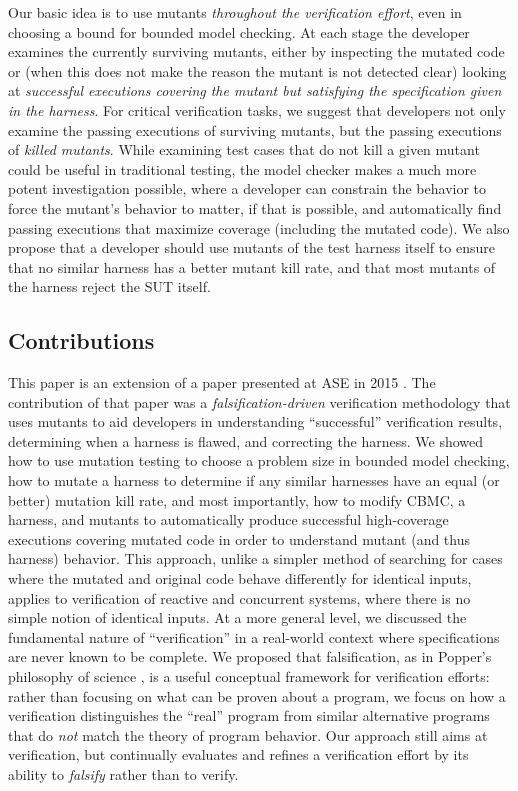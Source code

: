 \documentclass{svjour3}
\begin{document}
Our basic idea is to use mutants \emph{throughout the verification
  effort}, even in choosing a bound for bounded model checking.  At
each stage the developer examines the currently surviving mutants,
either by inspecting the mutated code or (when this does not make the
reason the mutant is not detected clear) looking at \emph{successful
  executions covering the mutant but satisfying the specification
  given in the harness}.  For critical verification tasks, we suggest
that developers not only examine the passing executions of surviving
mutants, but the passing executions of \emph{killed mutants}.  While
examining test cases that do not kill a given mutant could be useful
in traditional testing, the model checker makes a much more potent
investigation possible, where a developer can constrain the behavior
to force the mutant's behavior to matter, if that is possible, and
automatically find passing executions that maximize coverage
(including the mutated code).  We also propose that a developer should
use mutants of the test harness itself to ensure that no similar
harness has a better mutant kill rate, and that most mutants of the
harness reject the SUT itself.

\subsection{Contributions}

This paper is an extension of a paper presented at ASE in 2015
\cite{ase15}.  
The contribution of that paper was a \emph{falsification-driven}
verification methodology that uses mutants to aid developers 
 in understanding ``successful'' verification
results, determining when a harness is flawed, and correcting the harness.
We showed how to use mutation testing to
choose a problem size in bounded model checking, how to mutate a
harness to determine if any similar harnesses have an equal (or
better) mutation kill rate, and most importantly, how to modify CBMC,
a harness, and mutants to automatically produce successful
  high-coverage executions covering mutated code in order to
understand mutant (and thus harness) behavior.  This
approach, unlike a simpler method of searching for cases where the
mutated and original code behave differently for identical inputs,
applies to verification of reactive and concurrent systems, where
there is no simple notion of identical inputs.  
At a more general level, we discussed the fundamental nature of
``verification'' in a real-world context where specifications are
never known to be complete. We proposed that falsification, as in
Popper's philosophy of science \cite{Popper}, is a useful conceptual
framework for verification efforts: rather than focusing on what can
be proven about a program, we focus on how a
verification distinguishes the ``real'' program from similar
alternative programs that do \emph{not} match the theory of program
behavior.  Our approach still aims at verification, but continually
evaluates and refines a verification effort by its ability to
\emph{falsify} rather than to verify.
\end{document}
